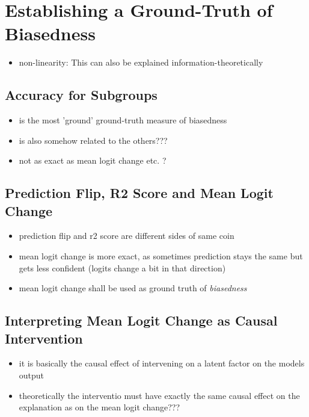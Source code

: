 \section{Establishing a Ground-Truth of Biasedness}
\begin{itemize}
    \item non-linearity: This can also be explained information-theoretically 
\end{itemize}

\subsection{Accuracy for Subgroups}
\begin{itemize}
    \item is the most 'ground' ground-truth measure of biasedness
    \item is also somehow related to the others??? 
    \item not as exact as mean logit change etc. ?
\end{itemize}

\subsection{Prediction Flip, R2 Score and Mean Logit Change}
\begin{itemize}
    \item prediction flip and r2 score are different sides of same coin
    \item mean logit change is more exact, as sometimes prediction stays the same but gets less confident (logits change a bit in that direction)
    \item mean logit change shall be used as ground truth of \textit{biasedness}
\end{itemize}

\subsection{Interpreting Mean Logit Change as Causal Intervention}
\begin{itemize}
    \item it is basically the causal effect of intervening on a latent factor on the models output
    \item theoretically the interventio must have exactly the same causal effect on the explanation as on the mean logit change??? 
\end{itemize}

